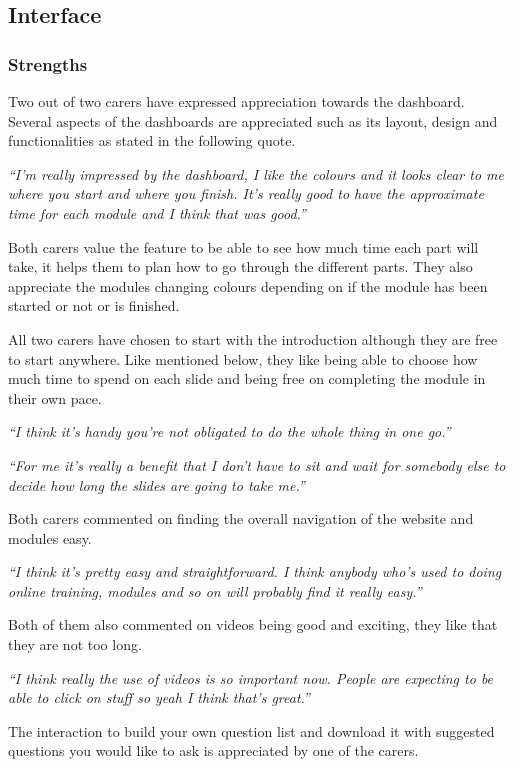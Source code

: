 \documentclass{sigchi}
\begin{document}
\subsection{Interface}
\subsubsection{Strengths}
Two out of two carers have expressed appreciation towards the dashboard. Several aspects of the dashboards are appreciated such as its layout, design and functionalities as stated in the following quote.  

\textit{“I’m really impressed by the dashboard, I like the colours and it looks clear to me where you start and where you finish. It’s really good to have the approximate time for each module and I think that was good.”}

Both carers value the feature to be able to see how much time each part will take, it helps them to plan how to go through the different parts. They also appreciate the modules changing colours depending on if the module has been started or not or is finished.

All two carers have chosen to start with the introduction although they are free to start anywhere. Like mentioned below, they like being able to choose how much time to spend on each slide and being free on completing the module in their own pace. 

\textit{“I think it’s handy you’re not obligated to do the whole thing in one go.”} 

\textit{“For me it’s really a benefit that I don't have to sit and wait for somebody else to decide how long the slides are going to take me.”}

Both carers commented on finding the overall navigation of the website and modules easy.

\textit{“I think it’s pretty easy and straightforward. I think anybody who’s used to doing online training, modules and so on will probably find it really easy.”}

Both of them also commented on videos being good and exciting, they like that they are not too long. 

\textit{“I think really the use of videos is so important now. People are expecting to be able to click on stuff so yeah I think that’s great.”}

The interaction to build your own question list and download it with suggested questions you would like to ask is appreciated by one of the carers. 
\end{document}
